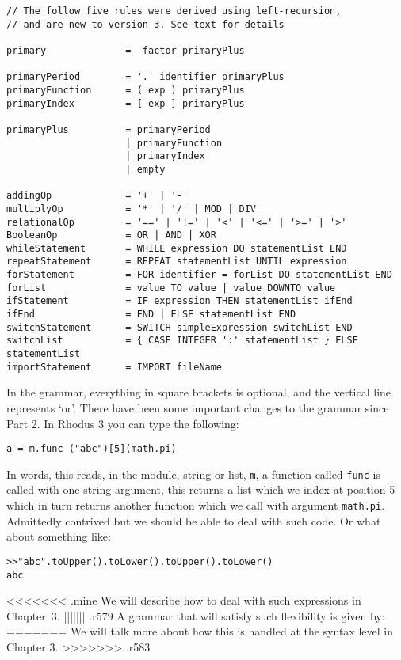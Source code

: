 \begin{verbatim}
// The follow five rules were derived using left-recursion,
// and are new to version 3. See text for details

primary              =  factor primaryPlus

primaryPeriod        = '.' identifier primaryPlus
primaryFunction      = ( exp ) primaryPlus
primaryIndex         = [ exp ] primaryPlus

primaryPlus          = primaryPeriod
                     | primaryFunction
                     | primaryIndex
                     | empty

addingOp             = '+' | '-'
multiplyOp           = '*' | '/' | MOD | DIV
relationalOp         = '==' | '!=' | '<' | '<=' | '>=' | '>'
BooleanOp            = OR | AND | XOR
whileStatement       = WHILE expression DO statementList END
repeatStatement      = REPEAT statementList UNTIL expression
forStatement         = FOR identifier = forList DO statementList END
forList              = value TO value | value DOWNTO value
ifStatement          = IF expression THEN statementList ifEnd
ifEnd                = END | ELSE statementList END
switchStatement      = SWITCH simpleExpression switchList END
switchList           = { CASE INTEGER ':' statementList } ELSE statementList
importStatement      = IMPORT fileName
\end{verbatim}
\normalsize


In the grammar, everything in square brackets is optional, and the vertical line represents `or'. There have been some important changes to the grammar since Part 2. In Rhodus 3 you can type the following:

\begin{lstlisting}
a = m.func ("abc")[5](math.pi)
\end{lstlisting}

In words, this reads, in the module, string or list, {\tt m}, a function called {\tt func} is called with one string argument, this returns a list which we index at position 5 which in turn returns another function which we call with argument {\tt math.pi}. Admittedly contrived but we should be able to deal with such code. Or what about something like:

\begin{lstlisting}
>>"abc".toUpper().toLower().toUpper().toLower()
abc
\end{lstlisting}

<<<<<<< .mine
We will describe how to deal with such expressions in Chapter~3.%
||||||| .r579
A grammar that will satisfy such flexibility is given by:
=======
We will talk more about how this is handled at the syntax level in Chapter 3.
>>>>>>> .r583

